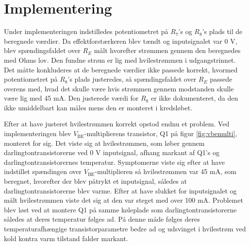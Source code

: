 \section{Implementering}
\label{effektforstaerker_implementering}

Under implementeringen indstilledes potentiometret på $R_7$'s og $R_8$'s plads til de beregnede værdier. Da effektforstærkeren blev tændt og inputsignalet var 0 V, blev spændingsfaldet over $R_E$ målt hvorefter strømmen gennem den beregnedes med Ohms lov. Den fundne strøm er lig med hvilestrømmen i udgangstrinnet. Det måtte konkluderes at de beregnede værdier ikke passede korrekt, hvormed potentiometret på $R_8$'s plads justeredes, så spændingsfaldet over $R_E$ passede overens med, hvad det skulle være hvis strømmen gennem modstanden skulle være lig med 45 mA. Den justerede værdi for $R_8$ er ikke dokumenteret, da den ikke umiddelbart kan måles mens den er monteret i kredsløbet.

Efter at have justeret hvilestrømmen korrekt opstod endnu et problem. Ved implementeringen blev $V_\mathrm{BE}$-multiplierens transistor, Q1 på figur \ref{fig:vbemulti}, monteret for sig. Det viste sig at hvilestrømmen, som løber gennem darlingtontransistorerne ved 0 V inputsignal, afhang markant af Q1's og darlingtontransistorernes temperatur. Symptomerne viste sig efter at have indstillet spændingen over $V_\mathrm{BE}$-multiplieren så hvilestrømmen var 45 mA, som beregnet, hvorefter der blev påtrykt et inputsignal, således at darlingtontransistorerne blev varme. Efter at have slukket for inputsignalet og målt hvilestrømmen viste det sig at den var steget med over 100 mA. Problemet blev løst ved at montere Q1 på samme køleplade som darlingtontransistorerne således at deres temperatur følges ad. På denne måde følges deres temperaturafhængige transistorparametre bedre ad og udsvinget i hvilestrøm ved kold kontra varm tilstand falder markant. 